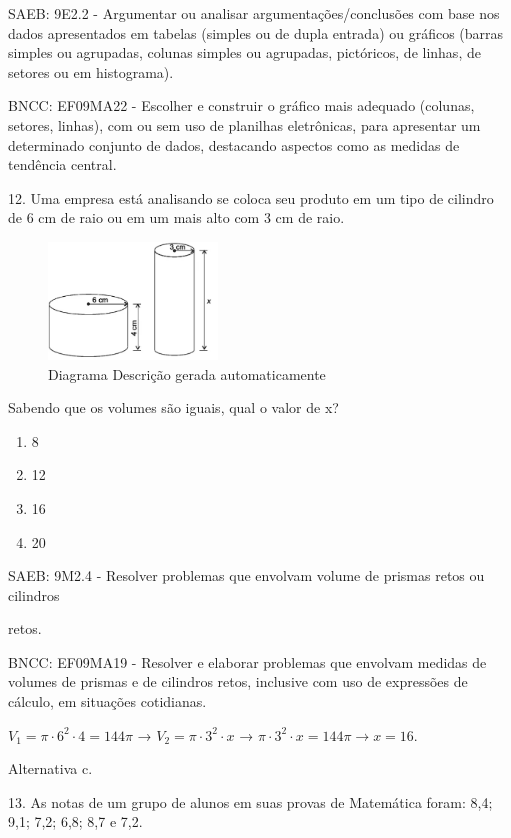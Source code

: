 \begin{escolha}
\begin{escolha}
\begin{escolha}
\begin{escolha}
{\begin{boxmedio}
\begin{boxpeq}
\begin{q°}
\begin{boxmedio}
\begin{boxpeq}
\begin{boxpeq}
\begin{boxmedio}
\begin{boxmedio}
\begin{boxmedio}
\begin{largebox}
\begin{boxmedio}
{\begin{escolha}
\begin{escolha}
\begin{escolha}
\begin{escolha}
\begin{escolha}
\begin{escolha}
{SAEB: 9E2.2 - Argumentar ou analisar argumentações/conclusões com base
nos dados apresentados em tabelas (simples ou de dupla entrada) ou
gráficos (barras simples ou agrupadas, colunas simples ou agrupadas,
pictóricos, de linhas, de setores ou em histograma).

BNCC: EF09MA22 - Escolher e construir o gráfico mais adequado (colunas,
setores, linhas), com ou sem uso de planilhas eletrônicas, para
apresentar um determinado conjunto de dados, destacando aspectos como as
medidas de tendência central.

12. Uma empresa está analisando se coloca seu produto em um tipo de
cilindro de 6 cm de raio ou em um mais alto com 3 cm de raio.

\begin{figure}
\centering
\includegraphics[width=1.77016in,height=1.22917in]{./_SAEB_9_MAT/media/image280.png}
\caption{Diagrama Descrição gerada automaticamente}
\end{figure}

Sabendo que os volumes são iguais, qual o valor de x?

\begin{enumerate}

\item
  8
\item
  12
\item
  16
\item
  20
\end{enumerate}

SAEB: 9M2.4 - Resolver problemas que envolvam volume de prismas retos ou
cilindros

retos.

BNCC: EF09MA19 - Resolver e elaborar problemas que envolvam medidas de
volumes de prismas e de cilindros retos, inclusive com uso de expressões
de cálculo, em situações cotidianas.

$V_{1} = \pi \cdot 6^{2} \cdot 4 = 144\pi$ →
$V_{2} = \pi \cdot 3^{2} \cdot x$ →
$\pi \cdot 3^{2} \cdot x = 144\pi \rightarrow x = 16.$

Alternativa c.

13. As notas de um grupo de alunos em suas provas de Matemática foram:
8,4; 9,1; 7,2; 6,8; 8,7 e 7,2.

}
\end{escolha}
\end{escolha}
\end{escolha}
\end{escolha}
\end{escolha}
\end{escolha}}
\end{boxmedio}
\end{largebox}
\end{boxmedio}
\end{boxmedio}
\end{boxmedio}
\end{boxpeq}
\end{boxpeq}
\end{boxmedio}
\end{q°}
\end{boxpeq}
\end{boxmedio}}
\end{escolha}
\end{escolha}
\end{escolha}
\end{escolha}

